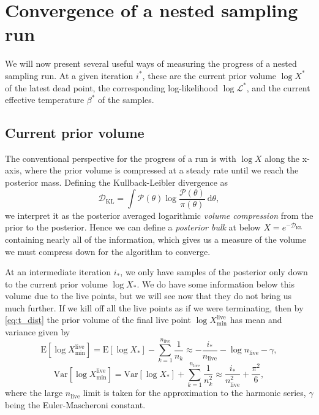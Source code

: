 \documentclass[usenatbib]{mnras}
\newcommand{\nlive}{n_\mathrm{live}}
\newcommand{\Like}{\mathcal{L}}
\newcommand{\DKL}{\mathcal{D}_\mathrm{KL}}
\begin{document}
\section{Convergence of a nested sampling run}\label{sec:convergence}
We will now present several useful ways of measuring the progress of a nested sampling run. At a given iteration $i^{*}$, these are the current prior volume $\log X^{*}$ of the latest dead point, the corresponding log-likelihood $\log\Like^{*}$, and the current effective temperature $\beta^{*}$ of the samples. 
\subsection{Current prior volume}\label{sec:volume_convergence}
The conventional perspective for the progress of a run is with $\log X$ along the x-axis, where the prior volume is compressed at a steady rate until we reach the posterior mass. Defining the Kullback-Leibler divergence as
\begin{equation}\label{eq:DKL}
	\DKL = \int \mathcal{P}(\theta) \log \frac{\mathcal{P}(\theta)}{\pi(\theta)}\ \mathrm{d}\theta,
\end{equation}
we interpret it as the posterior averaged logarithmic \textit{volume compression} from the prior to the posterior. Hence we can define a  \textit{posterior bulk} at below $X = e^{-\DKL}$ containing nearly all of the information, which gives us a measure of the volume we must compress down for the algorithm to converge.
\par
At an intermediate iteration $i_*$, we only have samples of the posterior only down to the current prior volume $\log X_*$. We do have some information below this volume due to the live points, but we will see now that they do not bring us much further. If we kill off all the live points as if we were terminating, then by \cref{eq:t_dist} the prior volume of the final live point $\log X_\mathrm{min}^{\mathrm{live}}$ has mean and variance given by
\begin{equation}
	\mathrm{E}[\log X_\mathrm{min}^{\mathrm{live}}] = \mathrm{E}[\log X_*] - \sum_{k=1}^{\nlive} \frac{1}{n_k} \approx -\frac{i_*}{\nlive} - \log \nlive - \gamma,
\end{equation}
\begin{equation}
	\mathrm{Var}[\log X_\mathrm{min}^{\mathrm{live}}] = \mathrm{Var}[\log X_*] + \sum_{k=1}^{\nlive} \frac{1}{n_k^2} \approx \frac{i_*}{\nlive^2} + \frac{\pi^2}{6},
\end{equation}
where the large $\nlive$ limit is taken for the approximation to the harmonic series, $\gamma$ being the Euler-Mascheroni constant.
\end{document}
